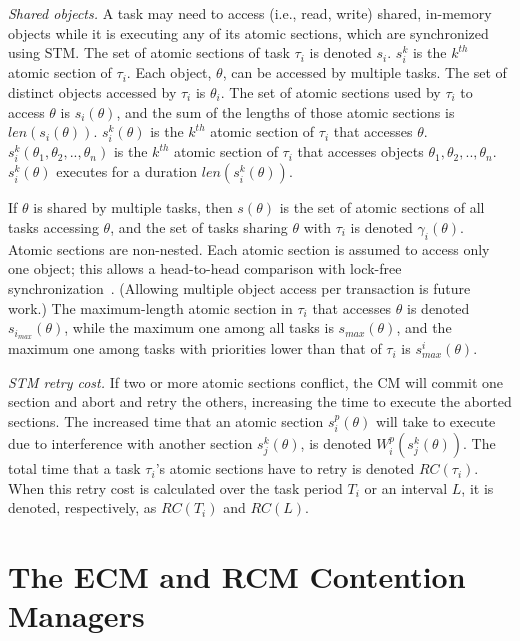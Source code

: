 \documentclass[12pt,english]{report}
\begin{document}
\textit{Shared objects.} A task may need to access (i.e., read, write) shared, in-memory objects while it is executing any of its atomic sections, which are synchronized using STM. 
The set of atomic sections of task $\tau_i$ is denoted $s_i$. $s_i^k$ is the $k^{th}$ atomic section of $\tau_i$. 
Each object, $\theta$, can be accessed by multiple tasks. The set of distinct objects accessed by $\tau_i$ is $\theta_i$. The set of atomic sections used by $\tau_i$ to access $\theta$ is $s_i(\theta)$, and the sum of the lengths of those atomic sections is $len(s_i(\theta))$. $s_i^k(\theta)$ is the $k^{th}$ atomic section of $\tau_i$ that accesses $\theta$. $s_i^k(\theta_1,\theta_2, .. ,\theta_n)$ is the $k^{th}$ atomic section of $\tau_i$ that accesses objects $\theta_1,\theta_2, .. ,\theta_n$. $s_i^k(\theta)$  executes for a duration $len(s_i^k(\theta))$.

If $\theta$ is shared by multiple tasks, then $s(\theta)$ is the set of atomic sections of all tasks accessing $\theta$, and the set of tasks sharing $\theta$ with $\tau_i$ is denoted $\gamma_i(\theta)$. Atomic sections are non-nested. Each atomic section is assumed to access only one object; this allows a head-to-head comparison with lock-free synchronization~\cite{key-5}.  (Allowing multiple object access per transaction is future work.) The maximum-length atomic section in $\tau_i$ that accesses $\theta$ is denoted $s_{i_{max}} (\theta)$, while the maximum one among all tasks is $s_{max} (\theta)$, and the maximum one among tasks with priorities lower than that of $\tau_i$ is $s_{max}^i (\theta)$.

\textit{STM retry cost.} If two or more atomic sections conflict, the CM will commit one section and abort and retry the others, increasing the time to execute the aborted sections. The increased time that an atomic section $s_i^p (\theta)$ will take to execute due to interference with another section $s_j^k (\theta)$, is denoted $W_{i}^{p}(s_{j}^{k}(\theta))$. The total time that a task $\tau_i$'s atomic sections have to retry is denoted $RC(\tau_i)$.
When this retry cost is calculated over the task period $T_i$ or an interval $L$, it is denoted, respectively, as $RC(T_i)$ and $RC(L)$.


\chapter{\label{ecm-rcm}The ECM and RCM Contention Managers}
\end{document}

